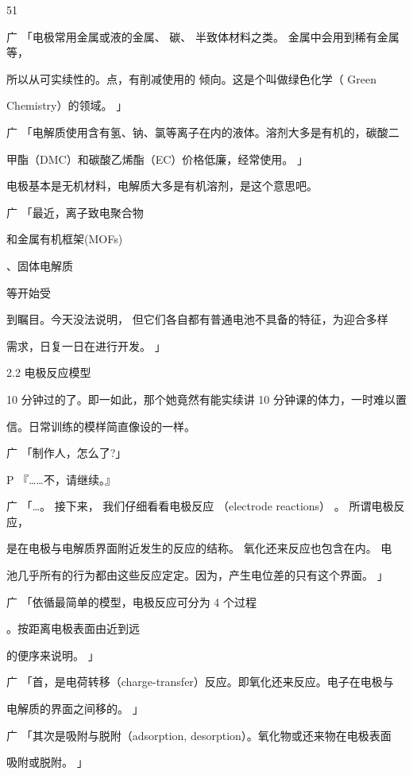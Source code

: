 51\par
广 「电极常用金属或液的金属、 碳、 半致体材料之类。 金属中会用到稀有金属等，\par
所以从可实续性的。点，有削减使用的 倾向。这是个叫做绿色化学（ Green\par
Chemistry）的领域。 」\par
广 「电解质使用含有氢、钠、氯等离子在内的液体。溶剂大多是有机的，碳酸二\par
甲酯（DMC）和碳酸乙烯酯（EC）价格低廉，经常使用。 」\par
电极基本是无机材料，电解质大多是有机溶剂，是这个意思吧。\par
广 「最近，离子致电聚合物\par
[1]\par
和金属有机框架(MOFs)\par
[2]\par
、固体电解质\par
[3]\par
等开始受\par
到瞩目。今天没法说明， 但它们各自都有普通电池不具备的特征，为迎合多样\par
需求，日复一日在进行开发。 」\par
2.2 电极反应模型\par
10 分钟过的了。即一如此，那个她竟然有能实续讲 10 分钟课的体力，一时难以置\par
信。日常训练的模样简直像设的一样。\par
广 「制作人，怎么了?」\par
P 『……不，请继续。』\par
广 「…。 接下来， 我们仔细看看电极反应 （electrode reactions） 。 所谓电极反应，\par
是在电极与电解质界面附近发生的反应的结称。 氧化还来反应也包含在内。 电\par
池几乎所有的行为都由这些反应定定。因为，产生电位差的只有这个界面。 」\par
广 「依循最简单的模型，电极反应可分为 4 个过程\par
[4]\par
。按距离电极表面由近到远\par
的便序来说明。 」\par
广 「首，是电荷转移（charge-transfer）反应。即氧化还来反应。电子在电极与\par
电解质的界面之间移的。 」\par
广 「其次是吸附与脱附（adsorption, desorption）。氧化物或还来物在电极表面\par
吸附或脱附。 」\par
